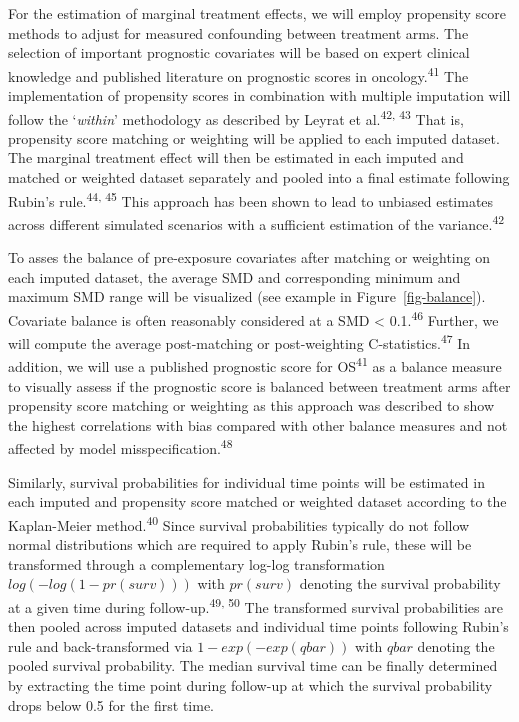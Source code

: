 \documentclass[
  letterpaper,
  DIV=11,
  numbers=noendperiod]{scrartcl}
\begin{document}
For the estimation of marginal treatment effects, we will employ
propensity score methods to adjust for measured confounding between
treatment arms. The selection of important prognostic covariates will be
based on expert clinical knowledge and published literature on
prognostic scores in oncology.\textsuperscript{41} The implementation of
propensity scores in combination with multiple imputation will follow
the `\emph{within}' methodology as described by Leyrat et
al.\textsuperscript{42, 43} That is, propensity score matching or
weighting will be applied to each imputed dataset. The marginal
treatment effect will then be estimated in each imputed and matched or
weighted dataset separately and pooled into a final estimate following
Rubin's rule.\textsuperscript{44, 45} This approach has been shown to
lead to unbiased estimates across different simulated scenarios with a
sufficient estimation of the variance.\textsuperscript{42}

To asses the balance of pre-exposure covariates after matching or
weighting on each imputed dataset, the average SMD and corresponding
minimum and maximum SMD range will be visualized (see example in
Figure~\ref{fig-balance}). Covariate balance is often reasonably
considered at a SMD \textless{} 0.1.\textsuperscript{46} Further, we
will compute the average post-matching or post-weighting
C-statistics.\textsuperscript{47} In addition, we will use a published
prognostic score for OS\textsuperscript{41} as a balance measure to
visually assess if the prognostic score is balanced between treatment
arms after propensity score matching or weighting as this approach was
described to show the highest correlations with bias compared with other
balance measures and not affected by model
misspecification.\textsuperscript{48}

Similarly, survival probabilities for individual time points will be
estimated in each imputed and propensity score matched or weighted
dataset according to the Kaplan-Meier method.\textsuperscript{40} Since
survival probabilities typically do not follow normal distributions
which are required to apply Rubin's rule, these will be transformed
through a complementary log-log transformation \(log(-log(1-pr(surv)))\)
with \(pr(surv)\) denoting the survival probability at a given time
during follow-up.\textsuperscript{49, 50} The transformed survival
probabilities are then pooled across imputed datasets and individual
time points following Rubin's rule and back-transformed via
\(1-exp(-exp(qbar))\) with \(qbar\) denoting the pooled survival
probability. The median survival time can be finally determined by
extracting the time point during follow-up at which the survival
probability drops below 0.5 for the first time.
\end{document}

